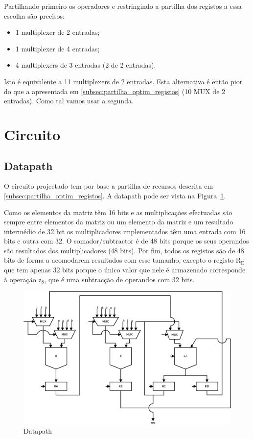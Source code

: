 \documentclass[a4paper]{article}
\begin{document}
Partilhando primeiro os operadores e restringindo a partilha dos registos a essa escolha são precisos:
\begin{itemize}
	\item 1 multiplexer de 2 entradas;
	\item 1 multiplexer de 4 entradas;
	\item 4 multiplexers de 3 entradas (2 de 2 entradas).
\end{itemize}
Isto é equivalente a 11 multiplexers de 2 entradas. Esta alternativa é então pior do que a apresentada em \ref{subsec:partilha_optim_registos} (10 MUX de 2 entradas). Como tal vamos usar a segunda.

\section{Circuito}
\subsection{Datapath}

O circuito projectado tem por base a partilha de recursos descrita em \ref{subsec:partilha_optim_registos}. A datapath pode ser vista na Figura~\ref{fig:datapath_original}.

Como os elementos da matriz têm 16 bits e as multiplicações efectuadas são sempre entre elementos da matriz ou um elemento da matriz e um resultado intermédio de 32 bit os multiplicadores implementados têm uma entrada com 16 bits e outra com 32. O somador/subtractor é de 48 bits porque os seus operandos são resultados dos multiplicadores (48 bits). Por fim, todos os registos são de 48 bits de forma a acomodarem resultados com esse tamanho, excepto o registo $\mathrm{R_D}$ que tem apenas 32 bits porque o único valor que nele é armazenado corresponde à operação $\mathrm{z_8}$, que é uma subtracção de operandos com 32 bits.

\begin{figure}[h]
	\centering
	\includegraphics[width=\linewidth]{schem_datapath}
	\caption{Datapath}
	\label{fig:datapath_original}
\end{figure}
\end{document}
